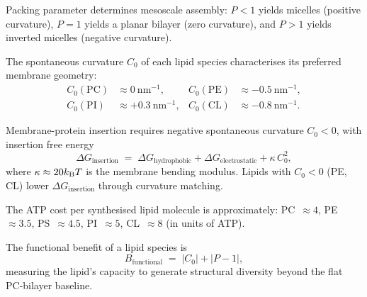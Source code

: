 \begin{theorem}
\label{thm:ch03-curvature-assembly}
Packing parameter determines mesoscale assembly:
$P<1$ yields micelles (positive curvature),
$P=1$ yields a planar bilayer (zero curvature), and
$P>1$ yields inverted micelles (negative curvature).
\end{theorem}

\begin{definition}
\label{def:ch03-spontaneous-curvature}
The spontaneous curvature $C_0$ of each lipid species characterises its preferred
membrane geometry:
\begin{align}
    C_0(\mathrm{PC}) &\approx 0~\mathrm{nm}^{-1}, &
    C_0(\mathrm{PE}) &\approx -0.5~\mathrm{nm}^{-1}, \nonumber\\
    C_0(\mathrm{PI}) &\approx +0.3~\mathrm{nm}^{-1}, &
    C_0(\mathrm{CL}) &\approx -0.8~\mathrm{nm}^{-1}.
    \label{eq:ch03-curvature-values}
\end{align}
\end{definition}

\begin{theorem}
\label{thm:ch03-transporter-assembly}
Membrane-protein insertion requires negative spontaneous curvature $C_0<0$, with
insertion free energy
\begin{equation}
    \Delta G_\mathrm{insertion}
    \;=\;
    \Delta G_\mathrm{hydrophobic}
    + \Delta G_\mathrm{electrostatic}
    + \kappa\,C_0^2,
    \label{eq:ch03-insertion}
\end{equation}
where $\kappa\approx 20k_{\mathrm{B}} T$ is the membrane bending modulus.  Lipids with
$C_0<0$ (PE, CL) lower $\Delta G_\mathrm{insertion}$ through curvature matching.
\end{theorem}

\begin{definition}
\label{def:ch03-lipid-cost}
The ATP cost per synthesised lipid molecule is approximately:
PC~$\approx 4$, PE~$\approx 3.5$, PS~$\approx 4.5$, PI~$\approx 5$,
CL~$\approx 8$ (in units of ATP).
\end{definition}

\begin{definition}
\label{def:ch03-functional-benefit}
The functional benefit of a lipid species is
\begin{equation}
    B_\mathrm{functional} \;=\; |C_0| + |P-1|,
    \label{eq:ch03-benefit}
\end{equation}
measuring the lipid's capacity to generate structural diversity beyond the flat
PC-bilayer baseline.
\end{definition}

